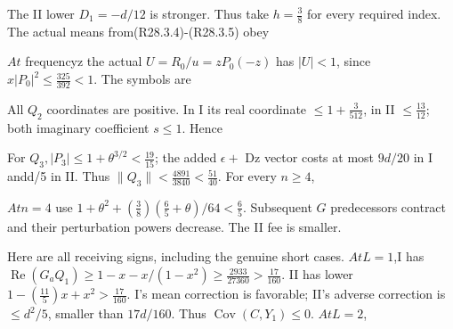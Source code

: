 
The II lower \(D_1=-d/12\) is stronger. Thus take \(h=\frac{3}{8}\) for every required index. The actual means from(R28.3.4)-(R28.3.5) obey


\(At\) frequencyz the actual \(U=R_0/u=zP_{0}(-z)\) has \(\lvert U\rvert <1\), since \(x\lvert P_0\rvert ^2\le \frac{325}{392}<1\). The symbols are


All \(Q_{2}\) coordinates are positive. In I its real coordinate \(\le 1+\frac{3}{512}\), in II \(\le \frac{13}{12}\); both imaginary coefficient \(s\le 1\). Hence


For \(Q_{3},\allowbreak \allowbreak \lvert P_{3}\rvert \le 1+\theta^{3/2}<\frac{19}{15}\); the added \(\epsilon+\) Dz vector costs at most \(9d/20\) in I andd/5 in II. Thus \(\lVert Q_{3}\rVert <\frac{4891}{3840}<\frac{51}{40}\). For every \(n\ge 4\),


\(At n=4\) use \(1+\theta^2+(\frac{3}{8})(\frac{6}{5}+\theta)/64<\frac{6}{5}\). Subsequent \(G\) predecessors contract and their perturbation powers decrease. The II fee is smaller.

Here are all receiving signs, including the genuine short cases. \(At L=1\),I has \(\operatorname{Re}(G_a Q_{1})\ge 1-x-x/(1-x^2)\ge \frac{2933}{27360}>\frac{17}{160}\). II has lower \(1-(\frac{11}{5})x+x^2>\frac{17}{160}\). I's mean correction is favorable; II's adverse correction is \(\le d^2/5\), smaller than \(17d/160\). Thus \(\operatorname{Cov}(C,\allowbreak \allowbreak Y_{1})\le 0\). \(At L=2\),


